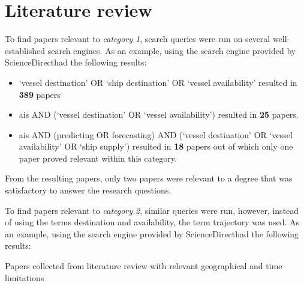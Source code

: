 \section{Literature review}
\label{sec:lit_review}

To find papers relevant to \textit{category 1}, search queries were run on several well-established search engines. As an example, using the search engine provided by ScienceDirect\footnotemark had the following results:

\begin{itemize}
    \item `vessel destination' OR `ship destination' OR `vessel availability' resulted in \textbf{389} papers
    \item ais AND (`vessel destination' OR `vessel availability') resulted in \textbf{25} papers.
    \item ais AND (predicting OR forecasting) AND (`vessel destination' OR `vessel availability' OR `ship supply') resulted in \textbf{18} papers out of which only one paper proved relevant within this category.
\end{itemize}

From the resulting papers, only two papers were relevant to a degree that was satisfactory to answer the research questions.

To find papers relevant to \textit{category 2}, similar queries were run, however, instead of using the terms destination and availability, the term trajectory was used. As an example, using the search engine provided by ScienceDirect\footnotemark[\value{footnote}] had the following results:




\begin{table}[tbp]
    \centering
    \label{tab:most_relevant_papers}
    \caption{Papers collected from literature review with relevant geographical and time limitations}
\end{table}